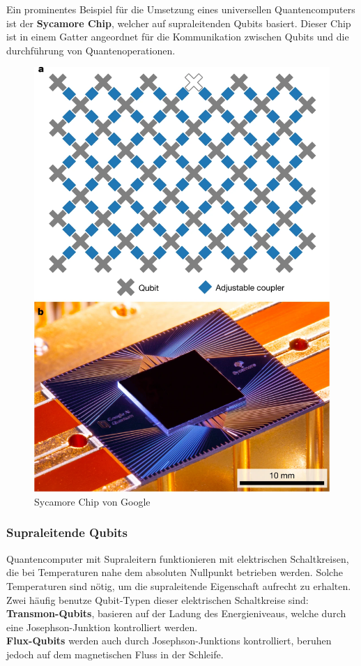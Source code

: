 Ein prominentes Beispiel für die Umsetzung eines universellen Quantencomputers ist der \textbf{Sycamore Chip}, welcher auf supraleitenden Qubits basiert.
Dieser Chip ist in einem Gatter angeordnet für die Kommunikation zwischen Qubits und die durchführung von Quantenoperationen.\\

\begin{figure}[H]
    \centering
    \includegraphics[width=0.7\linewidth]{img/SycamoreChip.png}
    \caption{Sycamore Chip von Google}
    \label{fig:Sycamore}
\end{figure}

\subsubsection{Supraleitende Qubits}
\label{subsub:superleiter}
Quantencomputer mit Supraleitern funktionieren mit elektrischen Schaltkreisen, die bei Temperaturen nahe dem absoluten Nullpunkt betrieben werden. Solche Temperaturen sind nötig,
um die supraleitende Eigenschaft aufrecht zu erhalten.\\

Zwei häufig benutze Qubit-Typen dieser elektrischen Schaltkreise sind:\\
\textbf{Transmon-Qubits}, basieren auf der Ladung des Energieniveaus, welche durch eine Josephson-Junktion kontrolliert werden.\\
\textbf{Flux-Qubits} werden auch durch Josephson-Junktions kontrolliert, beruhen jedoch auf dem magnetischen Fluss in der Schleife.\\


